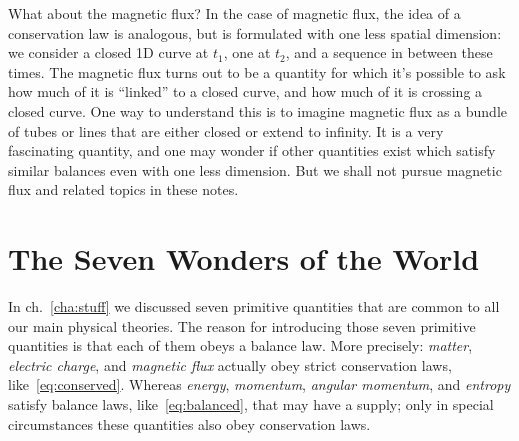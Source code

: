 \documentclass[a4paper,12pt,%
onecolumn,oneside,titlepage,%
british%
]{memoir}
\renewcommand*{\|}[1][]{\nonscript\:#1\vert\nonscript\:\mathopen{}}
\newcommand*{\chap}{ch.}%
\begin{document}
\begin{extra}{What about the magnetic flux?}
  In the case of magnetic flux, the idea of a conservation law is analogous, but is formulated with one less spatial dimension: we consider a closed 1D curve at $t_{1}$, one at $t_{2}$, and a sequence in between these times. The magnetic flux turns out to be a quantity for which it's possible to ask how much of it is \enquote{linked} to a closed curve, and how much of it is crossing a closed curve. One way to understand this is to imagine magnetic flux as a bundle of tubes or lines that are either closed or extend to infinity. It is a very fascinating quantity, and one may wonder if other quantities exist which satisfy similar balances even with one less dimension. But we shall not pursue magnetic flux and related topics in these notes.
\end{extra}


\section{The Seven Wonders of the World}
\label{sec:seven_wonders}

In \chap~\ref{cha:stuff} we discussed seven primitive quantities that are common to all our main physical theories. %
The reason for introducing those seven primitive quantities is that each of them obeys a balance law. More precisely: \emph{matter}, \emph{electric charge}, and \emph{magnetic flux} actually obey strict conservation laws, like~\eqref{eq:conserved}. Whereas \emph{energy}, \emph{momentum}, \emph{angular momentum}, and \emph{entropy} satisfy balance laws, like~\eqref{eq:balanced}, that may have a supply; only in special circumstances these quantities also obey conservation laws.
\end{document}
